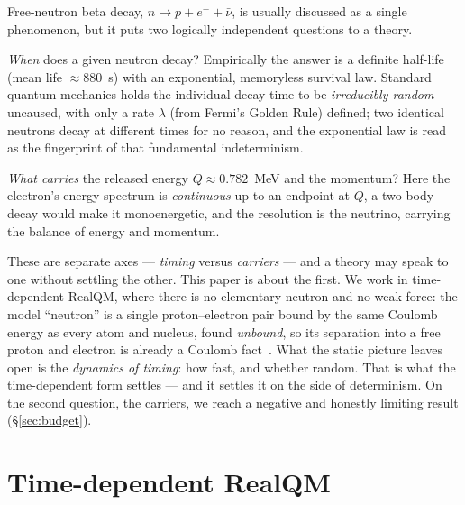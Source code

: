 \documentclass[11pt]{article}
\begin{document}
Free-neutron beta decay, $n\to p+e^-+\bar\nu$, is usually discussed as a single phenomenon, but it puts two
logically independent questions to a theory.

\emph{When} does a given neutron decay? Empirically the answer is a definite half-life (mean life
$\approx880$~s) with an exponential, memoryless survival law. Standard quantum mechanics holds the
individual decay time to be \emph{irreducibly random} --- uncaused, with only a rate $\lambda$ (from Fermi's
Golden Rule) defined; two identical neutrons decay at different times for no reason, and the exponential law
is read as the fingerprint of that fundamental indeterminism.

\emph{What carries} the released energy $Q\approx0.782$~MeV and the momentum? Here the electron's energy
spectrum is \emph{continuous} up to an endpoint at $Q$, a two-body decay would make it monoenergetic, and
the resolution is the neutrino, carrying the balance of energy and momentum.

These are separate axes --- \emph{timing} versus \emph{carriers} --- and a theory may speak to one without
settling the other. This paper is about the first. We work in time-dependent RealQM, where there is no
elementary neutron and no weak force: the model ``neutron'' is a single proton--electron pair bound by the
same Coulomb energy as every atom and nucleus, found \emph{unbound}, so its separation into a free proton
and electron is already a Coulomb fact~\cite{RealNucleus}. What the static picture leaves open is the
\emph{dynamics of timing}: how fast, and whether random. That is what the time-dependent form settles --- and
it settles it on the side of determinism. On the second question, the carriers, we reach a negative and
honestly limiting result (\S\ref{sec:budget}).

\section{Time-dependent RealQM}
\label{sec:td}
\end{document}
